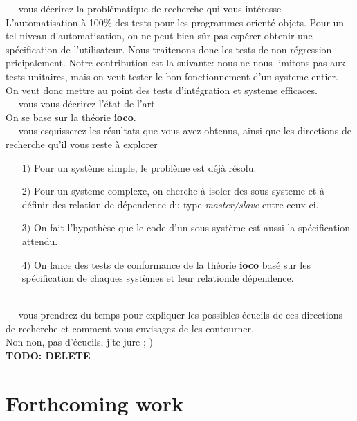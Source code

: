 \documentclass[a4paper]{report}
\begin{document}
--- vous décrirez la problématique de recherche qui vous intéresse\\
\newline
L'automatisation à 100\% des tests pour les programmes orienté objets. Pour un tel niveau d'automatisation, on ne peut bien sûr pas espérer obtenir une spécification de l'utilisateur. Nous traitenons donc les tests de non régression pricipalement. Notre contribution est la suivante: nous ne nous limitons pas aux tests unitaires, mais on veut tester le bon fonctionnement d'un systeme entier. On veut donc mettre au point des tests d'intégration et systeme efficaces.\\
\newline
\newline
--- vous vous décrirez l'état de l'art\\
\newline
On se base sur la théorie \textbf{ioco}.\\
\newline
\newline
--- vous esquisserez les résultats que vous avez obtenus, ainsi que  les directions de recherche qu'il vous reste à explorer\\
\newline
\begin{itemize}
\item[$ 1) $] Pour un système simple, le problème est déjà résolu.
\item[$ 2) $] Pour un systeme complexe, on cherche à isoler des sous-systeme et à définir des relation de dépendence du type \textit{master/slave} entre ceux-ci.
\item[$ 3) $] On fait l'hypothèse que le code d'un sous-système est aussi la spécification attendu.
\item[$ 4) $] On lance des tests de conformance de la théorie \textbf{ioco} basé sur les spécification de chaques systèmes et leur relationde dépendence.
\end{itemize}
$ $\\
\newline
\newline
--- vous prendrez du temps pour expliquer les possibles écueils de ces directions de recherche et comment vous envisagez de les contourner.\\
\newline
Non non, pas d'écueils, j'te jure ;-)\\
{\color{red} \textbf{TODO: DELETE}}

\chapter*{Forthcoming work}
\end{document}
